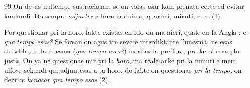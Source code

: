 \begin{VUpage}[103]{99}
On devas nultempe sustracionar, se on volas esar kom\cc
prenata certe ed evitar konfundi. Do sempre \textit{adjuntez} a horo\nl
la duimo, quarimi, minuti, e. c. (1).

Por questionar pri la horo, fakte existas en Ido du ma\cc
nieri, quale en la Angla :  e \textit{qua tempo esas?}\nl
Se forsan on agus tro severe interdiktante l'unesma, ne esas\nl
dubebla, ke la duesma (\textit{qua tempo esas?}) meritas la pre\cc
fero, pro ke ol esas plu justa. On ya ne questionas nur pri\nl
la \textit{horo}, ma reale anke pri la minuti e mem ulfoye sekundi\nl
qui adjuntesas a ta horo, do fakte on questionas \textit{pri la tempo,}\nl
on deziras \textit{konocar qua tempo esas} (2).
\end{VUpage}


